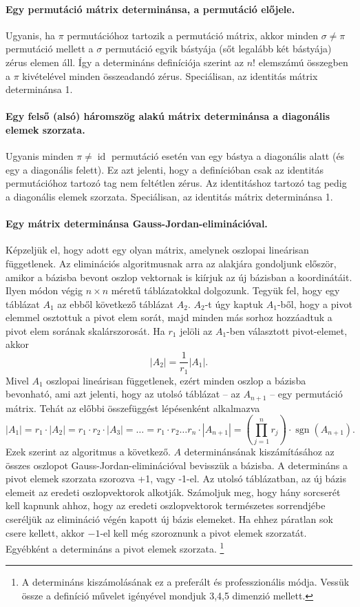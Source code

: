 \documentclass[9pt, a4paper, showtrims]{memoir}
\theoremstyle{plain}
\theoremstyle{remark}
\theoremstyle{definition}
\DeclareMathOperator{\sgn}{sgn}
\DeclareMathOperator{\id}{id}
\begin{document}
\paragraph{Egy permutáció mátrix determinánsa, a permutáció előjele.}
Ugyanis, ha $\pi$ permutációhoz tartozik a permutáció mátrix, akkor minden $\sigma\neq\pi$ permutáció mellett
a $\sigma$ permutáció egyik bástyája (sőt legalább két bástyája) zérus elemen áll. 
Így a determináns definíciója szerint az $n!$ elemszámú összegben a $\pi$ kivételével minden összeadandó zérus.
Speciálisan, az identitás mátrix determinánsa 1.

\paragraph{Egy felső (alsó) háromszög alakú mátrix determinánsa a diagonális elemek szorzata.}
Ugyanis minden $\pi\neq\id$ permutáció esetén van egy bástya a diagonális alatt (és egy a diagonális felett).
Ez azt jelenti, hogy a definícióban csak az identitás permutációhoz tartozó tag nem feltétlen zérus.
Az identitáshoz tartozó tag pedig a diagonális elemek szorzata.
Speciálisan, az identitás mátrix determinánsa 1.

\paragraph{Egy mátrix determinánsa Gauss-Jordan-eliminációval.}
Képzeljük el, hogy adott egy olyan mátrix, amelynek oszlopai lineárisan függetlenek.
Az eliminációs algoritmusnak arra az alakjára gondoljunk először, amikor a bázisba bevont oszlop vektornak
is kiírjuk az új bázisban a koordinátáit. 
Ilyen módon végig $n\times n$ méretű táblázatokkal dolgozunk.
Tegyük fel, hogy egy táblázat $A_1$ az ebből következő táblázat $A_2$.
$A_2$-t úgy kaptuk $A_1$-ből, hogy a pivot elemmel osztottuk a pivot elem sorát,
majd minden más sorhoz hozzáadtuk a pivot elem sorának skalárszorosát.
Ha $r_1$ jelöli az $A_1$-ben választott pivot-elemet, akkor
\[
    |A_2|=\frac{1}{r_1}|A_1|.
\]
Mivel $A_1$ oszlopai lineárisan függetlenek, ezért minden oszlop a bázisba bevonható,
ami azt jelenti, hogy az utolsó táblázat -- az $A_{n+1}$ -- egy permutáció mátrix.
Tehát az előbbi összefüggést lépésenként alkalmazva
\[
    |A_1|=r_1\cdot |A_2|=r_1\cdot r_2\cdot |A_3|=\dots=r_1\cdot r_2\dots r_{n}\cdot|A_{n+1}|=\left(\prod_{j=1}^nr_j  \right)\cdot\sgn(A_{n+1}).
\]
Ezek szerint az algoritmus a következő.
$A$ determinánsának kiszámításához az összes oszlopot Gauss-Jordan-eliminációval bevisszük a bázisba.
A determináns a pivot elemek szorzata szorozva +1, vagy -1-el.
Az utolsó táblázatban, az új bázis elemeit az eredeti oszlopvektorok alkotják.
Számoljuk meg, hogy hány sorcserét kell kapnunk ahhoz, hogy az eredeti oszlopvektorok természetes sorrendjébe cseréljük az elimináció
végén kapott új bázis elemeket. 
Ha ehhez páratlan sok csere kellett, akkor $-1$-el kell még szoroznunk a pivot elemek szorzatát.
Egyébként a determináns a pivot elemek szorzata.
\footnote{
A determináns kiszámolásának ez a preferált és professzionális módja. 
Vessük össze a definíció művelet igényével mondjuk 3,4,5 dimenzió mellett.}
\end{document}
